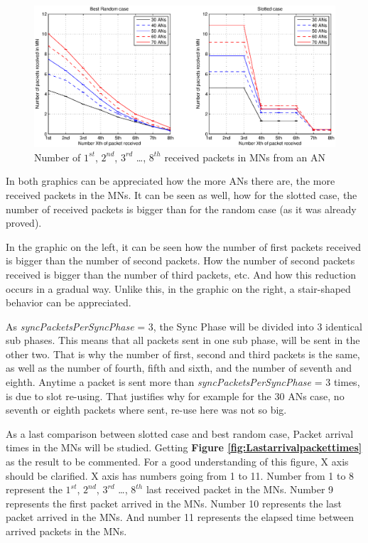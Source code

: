 \begin{figure}[ht]
 \begin{center}
  \includegraphics[width=1\textwidth]{numberOf1st2ndPacketsReceived.eps}
 \end{center}
 \caption{Number of $1^{st}$, $2^{nd}$, $3^{rd}$ \ldots, $8^{th}$ received packets in \acp{MN} from an \ac{AN}}
 \label{fig:numberOf1st2ndPacketsReceived}
\end{figure}

In both graphics can be appreciated how the more \acp{AN} there are, the more received packets in the \acp{MN}. It can be seen as well, how
for the slotted case, the number of received packets is bigger than for the random case (as it was already proved).

In the graphic on the left, it can be seen how the number of first packets received is bigger than the number of second packets. How the number of 
second packets received is bigger than the number of third packets, etc. And how this reduction occurs in a gradual way. Unlike this, in the graphic 
on the right, a stair-shaped behavior can be appreciated.

As \textit{syncPacketsPerSyncPhase} = 3, the Sync Phase will be divided into 3 identical sub phases. This means that all packets sent in one sub 
phase, will be sent in the other two. That is why the number of first, second and third packets is the same, as well as the number of fourth, fifth 
and sixth, and the number of seventh and eighth. Anytime a packet is sent more than \textit{syncPacketsPerSyncPhase} = 3 times, is due to slot re-using. 
That justifies why for example for the 30 \acp{AN} case, no seventh or eighth packets where sent, re-use here was not so big.

As a last comparison between slotted case and best random case, Packet arrival times in the \acp{MN} will be studied. Getting \textbf{Figure
\ref{fig:Lastarrivalpackettimes}} as the result to be commented. For a good understanding of this figure, X axis should be clarified. X axis has numbers
going from 1 to 11. Number from 1 to 8 represent the $1^{st}$, $2^{nd}$, $3^{rd}$ \ldots, $8^{th}$ last received packet in the \acp{MN}. Number 9 
represents the first packet arrived in the \acp{MN}. Number 10 represents the last packet arrived in the \acp{MN}. And number 11 represents the elapsed 
time between arrived packets in the \acp{MN}.

